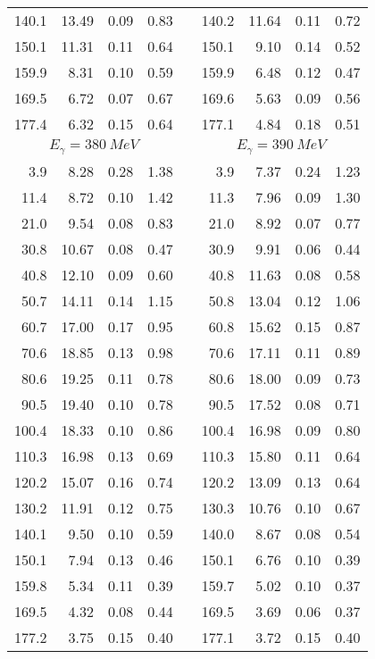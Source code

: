 \begin{table}[htbp]
\begin{center}
\begin{tabular}{|r|r|c|c|l|r|r|c|c|}
140.1 & 13.49 &  0.09 &  0.83 & & 140.2 & 11.64 &  0.11 &  0.72 \\ 
150.1 & 11.31 &  0.11 &  0.64 & & 150.1 &  9.10 &  0.14 &  0.52 \\ 
159.9 &  8.31 &  0.10 &  0.59 & & 159.9 &  6.48 &  0.12 &  0.47 \\ 
169.5 &  6.72 &  0.07 &  0.67 & & 169.6 &  5.63 &  0.09 &  0.56 \\ 
177.4 &  6.32 &  0.15 &  0.64 & & 177.1 &  4.84 &  0.18 &  0.51 \\ 
\hline 
\hline 
\multicolumn{4}{|c|}{ $E_{\gamma}=380~MeV$} & & 
\multicolumn{4}{c|}{ $E_{\gamma}=390~MeV$} \\ 
\cline{1-4} 
\cline{6-9} 
  3.9 &  8.28 &  0.28 &  1.38 & &   3.9 &  7.37 &  0.24 &  1.23 \\ 
 11.4 &  8.72 &  0.10 &  1.42 & &  11.3 &  7.96 &  0.09 &  1.30 \\ 
 21.0 &  9.54 &  0.08 &  0.83 & &  21.0 &  8.92 &  0.07 &  0.77 \\ 
 30.8 & 10.67 &  0.08 &  0.47 & &  30.9 &  9.91 &  0.06 &  0.44 \\ 
 40.8 & 12.10 &  0.09 &  0.60 & &  40.8 & 11.63 &  0.08 &  0.58 \\ 
 50.7 & 14.11 &  0.14 &  1.15 & &  50.8 & 13.04 &  0.12 &  1.06 \\ 
 60.7 & 17.00 &  0.17 &  0.95 & &  60.8 & 15.62 &  0.15 &  0.87 \\ 
 70.6 & 18.85 &  0.13 &  0.98 & &  70.6 & 17.11 &  0.11 &  0.89 \\ 
 80.6 & 19.25 &  0.11 &  0.78 & &  80.6 & 18.00 &  0.09 &  0.73 \\ 
 90.5 & 19.40 &  0.10 &  0.78 & &  90.5 & 17.52 &  0.08 &  0.71 \\ 
100.4 & 18.33 &  0.10 &  0.86 & & 100.4 & 16.98 &  0.09 &  0.80 \\ 
110.3 & 16.98 &  0.13 &  0.69 & & 110.3 & 15.80 &  0.11 &  0.64 \\ 
120.2 & 15.07 &  0.16 &  0.74 & & 120.2 & 13.09 &  0.13 &  0.64 \\ 
130.2 & 11.91 &  0.12 &  0.75 & & 130.3 & 10.76 &  0.10 &  0.67 \\ 
140.1 &  9.50 &  0.10 &  0.59 & & 140.0 &  8.67 &  0.08 &  0.54 \\ 
150.1 &  7.94 &  0.13 &  0.46 & & 150.1 &  6.76 &  0.10 &  0.39 \\ 
159.8 &  5.34 &  0.11 &  0.39 & & 159.7 &  5.02 &  0.10 &  0.37 \\ 
169.5 &  4.32 &  0.08 &  0.44 & & 169.5 &  3.69 &  0.06 &  0.37 \\ 
177.2 &  3.75 &  0.15 &  0.40 & & 177.1 &  3.72 &  0.15 &  0.40 \\ 
\cline{1-4} 
\cline{6-9} 
\end{tabular} 

\end{center} 
\end{table}
